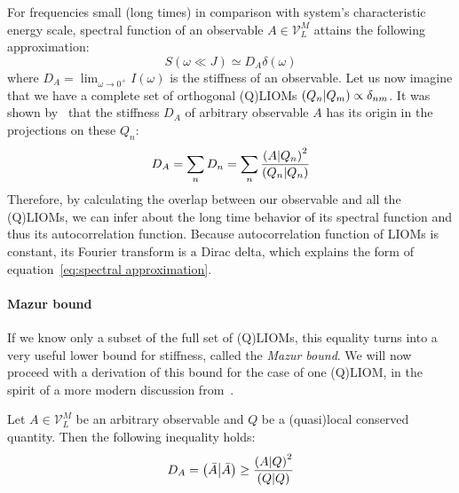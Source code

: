 For frequencies small (long times) in comparison with system's characteristic energy
scale, spectral function of an observable \(A \in \mathcal{V}_L^M\) attains the following approximation:
\begin{equation}
  S(\omega \ll  J) \simeq  D_{A} \delta(\omega)
  \label{eq:spectral approximation}
\end{equation}
where \(D_A = \lim_{\omega\to 0^+} I(\omega)\) is the stiffness of an observable.
Let us now imagine that we have a complete set of orthogonal (Q)LIOMs 
\(\left(Q_{n} \middle| Q_{m}\right) \propto \delta_{nm}\). It was shown 
by~\textcite{Mazur1969,Suzuki1971} that the stiffness \(D_{A}\) of arbitrary observable \(A\) has its origin
in the projections on these \(Q_{n}\):
\begin{equation}
  D_A = \sum_{n} D_{n} = \sum_{n} \frac{\left(A \middle| Q_{n}\right)^2}
  {\left(Q_{n} \middle| Q_{n}\right)}
  \label{eq:mazur equality}
\end{equation}
Therefore, by calculating the overlap between our observable and all the (Q)LIOMs, we can infer about the long time
behavior of its spectral function and thus its autocorrelation function. Because autocorrelation function of
LIOMs is constant, its Fourier transform is a Dirac delta, which explains the form of 
equation~\eqref{eq:spectral approximation}. 

\paragraph{Mazur bound} If we know only a subset of the full set of (Q)LIOMs, this equality turns into 
a very useful lower bound for stiffness, called the \textit{Mazur bound}. We will now proceed with a derivation
of this bound for the case of one (Q)LIOM, in the spirit of a more modern discussion from~\textcite{Ilievski2016a}.
\begin{proposition}
  Let \(A\in \mathcal{V}_L^M\) be an arbitrary observable and \(Q\) be a (quasi)local conserved quantity. Then the following inequality
  holds:
  \begin{equation*}
    D_{A} = \left(\bar{A} \middle| \bar{A}\right) \geq \frac{\left(A \middle| Q\right)^2}{\left(Q \middle| Q\right)}
  \end{equation*}
  \label{prop:single mazur}
\end{proposition}

